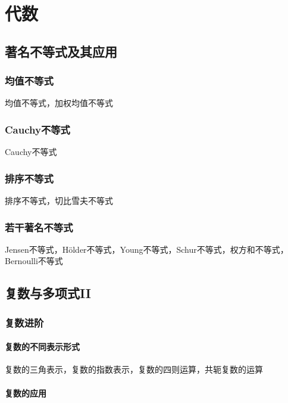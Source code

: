 \documentclass[lang=cn, zihao=5]{elegantbook}
\begin{document}
\part{代数}

\chapter{著名不等式及其应用}

\section{均值不等式}

均值不等式，加权均值不等式

\section{Cauchy不等式}

Cauchy不等式

\section{排序不等式}

排序不等式，切比雪夫不等式

\section{若干著名不等式}

Jensen不等式，Hölder不等式，Young不等式，Schur不等式，权方和不等式，Bernoulli不等式

\chapter{复数与多项式II}

\section{复数进阶}

\subsection{复数的不同表示形式}

复数的三角表示，复数的指数表示，复数的四则运算，共轭复数的运算

\subsection{复数的应用}
\end{document}
